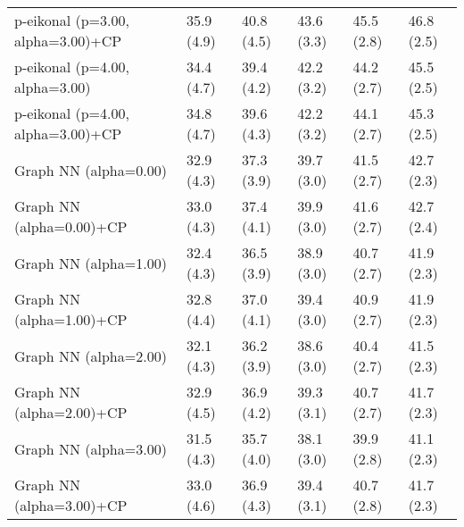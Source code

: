 \documentclass{article}
\begin{document}
\begin{table*}[t!]
\begin{center}
\begin{small}
\begin{sc}
\begin{tabular}{llllll}
p-eikonal (p=3.00, alpha=3.00)+CP&35.9 (4.9)      &40.8 (4.5)      &43.6 (3.3)      &45.5 (2.8)      &46.8 (2.5)      \\
p-eikonal (p=4.00, alpha=3.00)&34.4 (4.7)      &39.4 (4.2)      &42.2 (3.2)      &44.2 (2.7)      &45.5 (2.5)      \\
p-eikonal (p=4.00, alpha=3.00)+CP&34.8 (4.7)      &39.6 (4.3)      &42.2 (3.2)      &44.1 (2.7)      &45.3 (2.5)      \\
Graph NN (alpha=0.00)&32.9 (4.3)      &37.3 (3.9)      &39.7 (3.0)      &41.5 (2.7)      &42.7 (2.3)      \\
Graph NN (alpha=0.00)+CP&33.0 (4.3)      &37.4 (4.1)      &39.9 (3.0)      &41.6 (2.7)      &42.7 (2.4)      \\
Graph NN (alpha=1.00)&32.4 (4.3)      &36.5 (3.9)      &38.9 (3.0)      &40.7 (2.7)      &41.9 (2.3)      \\
Graph NN (alpha=1.00)+CP&32.8 (4.4)      &37.0 (4.1)      &39.4 (3.0)      &40.9 (2.7)      &41.9 (2.3)      \\
Graph NN (alpha=2.00)&32.1 (4.3)      &36.2 (3.9)      &38.6 (3.0)      &40.4 (2.7)      &41.5 (2.3)      \\
Graph NN (alpha=2.00)+CP&32.9 (4.5)      &36.9 (4.2)      &39.3 (3.1)      &40.7 (2.7)      &41.7 (2.3)      \\
Graph NN (alpha=3.00)&31.5 (4.3)      &35.7 (4.0)      &38.1 (3.0)      &39.9 (2.8)      &41.1 (2.3)      \\
Graph NN (alpha=3.00)+CP&33.0 (4.6)      &36.9 (4.3)      &39.4 (3.1)      &40.7 (2.8)      &41.7 (2.3)      \\
\bottomrule
\end{tabular}
\end{sc}
\end{small}
\end{center}
\vskip -0.1in
\end{table*}
\end{document}
